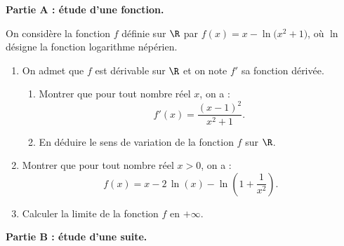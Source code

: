 \begin{Centrage}
	\textbf{Partie A : étude d'une fonction.}
\end{Centrage}

On considère la fonction $f$ définie sur $\R$ par $f(x)=x-\ln\big(x^2+1\big)$, où $\ln$ désigne la fonction logarithme népérien.

\begin{enumerate}
	\item On admet que $f$ est dérivable sur $\R$ et on note $f'$ sa fonction dérivée.
	\begin{enumerate}
		\item Montrer que pour tout nombre réel $x$, on a : \[ f'(x)=\frac{(x-1)^2}{x^2+1}. \]
		\item En déduire le sens de variation de la fonction $f$ sur $\R$.
	\end{enumerate}
	\item Montrer que pour tout nombre réel $x>0$, on a : \[ f(x) = x-2\,\ln(x)-\ln\left(1+\frac{1}{x^2}\right). \]
	\item Calculer la limite de la fonction $f$ en $+\infty$.
\end{enumerate}

\begin{Centrage}
	\textbf{Partie B : étude d'une suite.}
\end{Centrage}

